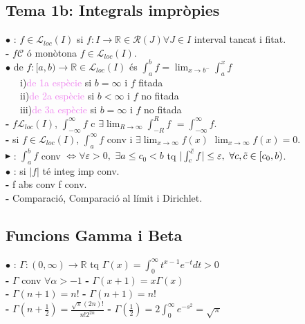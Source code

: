\documentclass[10pt]{article}
\newcommand{\real}{\mathbb{R}}
\newcommand{\C}{\mathscr{C}}
\let\u\relax
\newcommand{\u}[1]{\underline{#1}}
\begin{document}
\begin{multicols}{4}
\section*{Tema 1b: Integrals impròpies}

$\bullet$ \u{\textcolor{violet}{funció localm. integ}}: $f\in\mathcal{L}_{loc}(I)$ si $f:I\to\real \in\mathcal{R}(J) \forall J \in I$ interval tancat i fitat.\\
\textbf{-} $f\C$ ó monòtona \implies $f\in\mathcal{L}_{loc}(I)$.\\
$\bullet$ \u{\textcolor{violet}{integral impròpia}} de $f:[a,b)\to\real \in\mathcal{L}_{loc}(I)$ és $\int_a^b{f} = \displaystyle\lim_{x\to b^{-}}\int_a^x{f}$\\
\ \ \ i)\textcolor{violet}{de 1a espècie} si $b =\infty$ i $f$ fitada\\
\ \ \ ii)\textcolor{violet}{de 2a espècie} si $b <\infty$ i $f$ no fitada\\
\ \ \ iii)\textcolor{violet}{de 3a espècie} si $b =\infty$ i $f$ no fitada\\
\textbf{-} $f\mathcal{L}_{loc}(I)$, $\int_{-\infty}^{\infty}f$ c \implies $\exists\displaystyle\lim_{R\to\infty}\int_{-R}^{R}{f}$ $= \int_{-\infty}^{\infty}f$.\\
\textbf{-} si $f\in\mathcal{L}_{loc}(I)$, $\int_{a}^{\infty}f$ conv i $\exists\displaystyle\lim_{x\to\infty}f(x)$ \implies $\displaystyle\lim_{x\to\infty}f(x) = 0$.\\
$\blacktriangleright$ \u{\textbf{C.Cauchy}}: $\int_a^b f$ conv $\iff \forall\varepsilon>0,$ $\exists a\le c_0<b$ tq $|\int_c^{\Tilde{c}}f| \le\varepsilon,\ \forall c,\Tilde{c}\in[c_0,b)$.\\
$\bullet$ \u{\textcolor{violet}{integral imp. abs. conv}}: si $|f|$ té integ imp conv.\\
\textbf{-} f abs conv \implies f conv.\\
\textbf{-} Comparació, Comparació al límit i Dirichlet.\\

\subsection*{Funcions Gamma i Beta}
$\bullet$ \u{\textcolor{violet}{Gamma}}: $\Gamma:(0,\infty)\to\real$ tq $\Gamma(x) = \int_0^\infty t^{x-1}e^{-t}dt > 0$\\
\textbf{-} $\Gamma$ conv $\forall\alpha>-1$ \space \space \space \textbf{-} $\Gamma(x+1) = x\Gamma(x)$\\
\textbf{-} $\Gamma(n+1) = n!$ \space \space \space \space \space \space \textbf{-} $\Gamma(n+1) = n!$\\
\textbf{-} $\Gamma(n+\frac{1}{2}) = \frac{\sqrt{\pi}(2n)!}{n!2^{2n}}$ \textbf{-} $\Gamma(\frac{1}{2}) = 2\int_0^\infty{e^{-s^2}} = \sqrt{\pi}$\\


\end{multicols}
\end{document}
